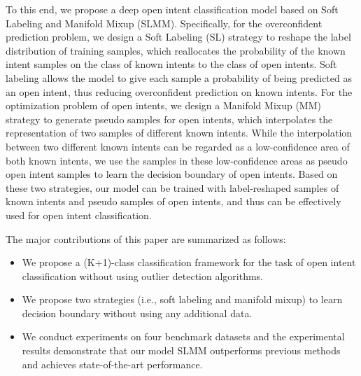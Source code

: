 \documentclass[journal]{IEEEtran}
\begin{document}
To this end, we propose a deep open intent classification model based on Soft Labeling and Manifold Mixup (SLMM).
Specifically, for the overconfident prediction problem, we design a Soft Labeling (SL) strategy to reshape the label distribution of training samples, which reallocates the probability of the known intent samples on the class of known intents to the class of open intents.
Soft labeling allows the model to give each sample a probability of being predicted as an open intent, thus reducing overconfident prediction on known intents.
For the optimization problem of open intents, we design a Manifold Mixup (MM) strategy to generate pseudo samples for open intents, which interpolates the representation of two samples of different known intents.
While the interpolation between two different known intents can be regarded as a low-confidence area of both known intents, we use the samples in these low-confidence areas as pseudo open intent samples to learn the decision boundary of open intents.
Based on these two strategies, our model can be trained with label-reshaped samples of known intents and pseudo samples of open intents, and thus can be effectively used for open intent classification.

The major contributions of this paper are summarized as follows:
\begin{itemize}
\item We propose a (K+1)-class classification framework for the task of open intent classification without using outlier detection algorithms.
\item We propose two strategies (i.e., soft labeling and manifold mixup) to learn decision boundary without using any additional data.
\item We conduct experiments on four benchmark datasets and the experimental results demonstrate that our model SLMM outperforms previous methods and achieves state-of-the-art performance.
\end{itemize}

\end{document}
